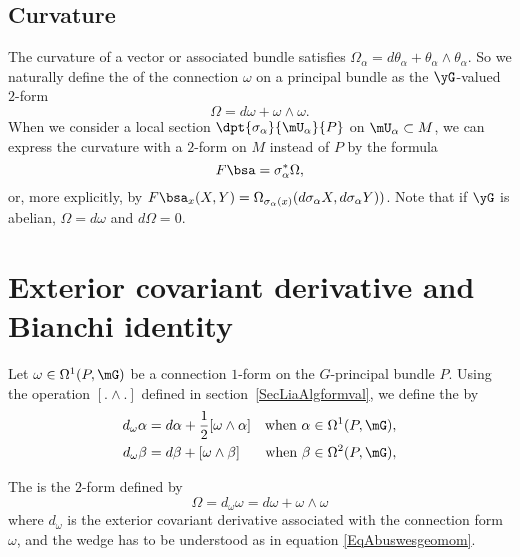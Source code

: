 \subsection{Curvature}

The curvature of a vector or associated bundle satisfies $\Omega_{\alpha}=d\theta_{\alpha}+\theta_{\alpha}\wedge\theta_{\alpha}$. So we naturally define the  of the connection $\omega$ on a principal bundle as the $\yG$-valued $2$-form
\begin{equation}
	\Omega=d\omega+\omega\wedge\omega.
\end{equation}
When we consider a local section\label{PgLocSecCurv} $\dpt{\sigma_{\alpha}}{\mU_{\alpha}}{P}$ on $\mU_{\alpha}\subset M$, we can express the curvature with a $2$-form on $M$ instead of $P$ by the formula \label{pg:curv_princ}
\[
	F\bsa=\sigma_{\alpha}^*\Omega,
\]
or, more explicitly, by $F\bsa_x(X,Y)=\Omega_{\sigma_{\alpha}(x)}(d\sigma_{\alpha} X,d\sigma_{\alpha} Y))$. Note that if $\yG$ is abelian, $\Omega=d\omega$ and $d\Omega=0$.

\section{Exterior covariant derivative and Bianchi identity}

Let $\omega\in\Omega^1(P,\mG)$ be a connection $1$-form on the $G$-principal bundle $P$. Using the operation $[.\wedge .]$ defined in section~\ref{SecLiaAlgformval}, we define the  by  %
\begin{align}
	d_{\omega}\alpha & =d\alpha+\frac{ 1 }{2}[\omega\wedge\alpha] & \text{when }\alpha\in\Omega^1(P,\mG), \\
	d_{\omega}\beta  & =d\beta+[\omega\wedge\beta]                & \text{when }\beta\in\Omega^2(P,\mG),
\end{align}

The  is the $2$-form defined by
\begin{equation}
	\Omega=d_{\omega}\omega=d\omega+\omega\wedge\omega
\end{equation}
where $d_{\omega}$ is the exterior covariant derivative associated with the connection form $\omega$, and the wedge has to be understood as in equation \eqref{EqAbuswesgeomom}.

